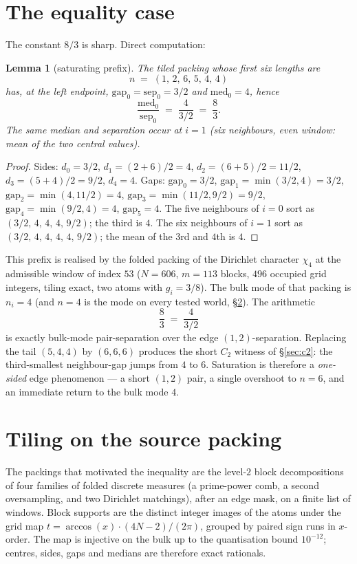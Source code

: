 \documentclass[11pt]{article}
\newtheorem{lemma}{Lemma}
\theoremstyle{remark}
\begin{document}
\section{The equality case}\label{sec:equality}

The constant $8/3$ is sharp.  Direct computation:

\begin{lemma}[saturating prefix]\label{lem:equality}
The tiled packing whose first six lengths are
\[
n \;=\; (1,\,2,\,6,\,5,\,4,\,4)
\]
has, at the left endpoint,
$\mathrm{gap}_0=\mathrm{sep}_0=3/2$ and $\mathrm{med}_0=4$, hence
\[
\frac{\mathrm{med}_0}{\mathrm{sep}_0} \;=\; \frac{4}{3/2} \;=\; \frac83.
\]
The same median and separation occur at $i=1$ (six neighbours, even
window: mean of the two central values).
\end{lemma}

\begin{proof}
Sides: $d_0=3/2$, $d_1=(2+6)/2=4$, $d_2=(6+5)/2=11/2$,
$d_3=(5+4)/2=9/2$, $d_4=4$.  Gaps:
$\mathrm{gap}_0=3/2$,
$\mathrm{gap}_1=\min(3/2,4)=3/2$,
$\mathrm{gap}_2=\min(4,11/2)=4$,
$\mathrm{gap}_3=\min(11/2,9/2)=9/2$,
$\mathrm{gap}_4=\min(9/2,4)=4$,
$\mathrm{gap}_5=4$.
The five neighbours of $i=0$ sort as
$(3/2,\,4,\,4,\,4,\,9/2)$; the third is $4$.
The six neighbours of $i=1$ sort as
$(3/2,\,4,\,4,\,4,\,4,\,9/2)$; the mean of the $3$rd and $4$th is
$4$.
\end{proof}

This prefix is realised by the folded packing of the Dirichlet
character $\chi_4$ at the admissible window of index $53$
($N=606$, $m=113$ blocks, $496$ occupied grid integers, tiling
exact, two atoms with $g_i=3/8$).  The bulk mode of that packing
is $n_i=4$ (and $n=4$ is the mode on every tested world,
\S\ref{sec:census}).  The arithmetic
\[
\frac83 \;=\; \frac{4}{3/2}
\]
is exactly bulk-mode pair-separation over the edge $(1,2)$-separation.
Replacing the tail $(5,4,4)$ by $(6,6,6)$ produces the short $C_2$
witness of \S\ref{sec:c2}: the third-smallest neighbour-gap jumps
from $4$ to $6$.  Saturation is therefore a \emph{one-sided} edge
phenomenon --- a short $(1,2)$ pair, a single overshoot to $n=6$,
and an immediate return to the bulk mode $4$.

\section{Tiling on the source packing}\label{sec:census}

The packings that motivated the inequality are the level-$2$
block decompositions of four families of folded discrete measures
(a prime-power comb, a second oversampling, and two Dirichlet
matchings), after an edge mask, on a finite list of windows.  Block
supports are the distinct integer images of the atoms under the
grid map $t=\arccos(x)\cdot(4N-2)/(2\pi)$, grouped by paired sign
runs in $x$-order.  The map is injective on the bulk up to the
quantisation bound $10^{-12}$; centres, sides, gaps and medians
are therefore exact rationals.
\end{document}

